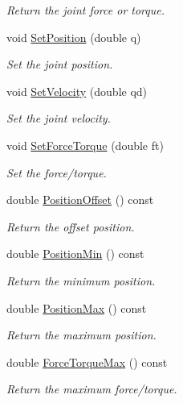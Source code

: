 \begin{DoxyCompactItemize}
\begin{DoxyCompactList}\small\item\em Return the joint force or torque. \end{DoxyCompactList}\item 
void \hyperlink{classrob_joint_a6de5b272b7e94f90db7a3fba6f729b6b}{Set\+Position} (double q)
\begin{DoxyCompactList}\small\item\em Set the joint position. \end{DoxyCompactList}\item 
void \hyperlink{classrob_joint_a9b9f7d88fe9bf54a5343d5143eda9267}{Set\+Velocity} (double qd)
\begin{DoxyCompactList}\small\item\em Set the joint velocity. \end{DoxyCompactList}\item 
void \hyperlink{classrob_joint_a863fa17f51425274496e92562c8b8c0b}{Set\+Force\+Torque} (double ft)
\begin{DoxyCompactList}\small\item\em Set the force/torque. \end{DoxyCompactList}\item 
double \hyperlink{classrob_joint_a5aeadbcac7ae0db2d8df7566f7398e5b}{Position\+Offset} () const 
\begin{DoxyCompactList}\small\item\em Return the offset position. \end{DoxyCompactList}\item 
double \hyperlink{classrob_joint_a82a39d2bfeb5bc91b36b95b7e537b317}{Position\+Min} () const 
\begin{DoxyCompactList}\small\item\em Return the minimum position. \end{DoxyCompactList}\item 
double \hyperlink{classrob_joint_a4a49b6789863b0e27658d6dbaa283dab}{Position\+Max} () const 
\begin{DoxyCompactList}\small\item\em Return the maximum position. \end{DoxyCompactList}\item 
double \hyperlink{classrob_joint_a368248c100fc00ed816374b97e5826ee}{Force\+Torque\+Max} () const 
\begin{DoxyCompactList}\small\item\em Return the maximum force/torque. \end{DoxyCompactList}\item 

\end{DoxyCompactItemize}

